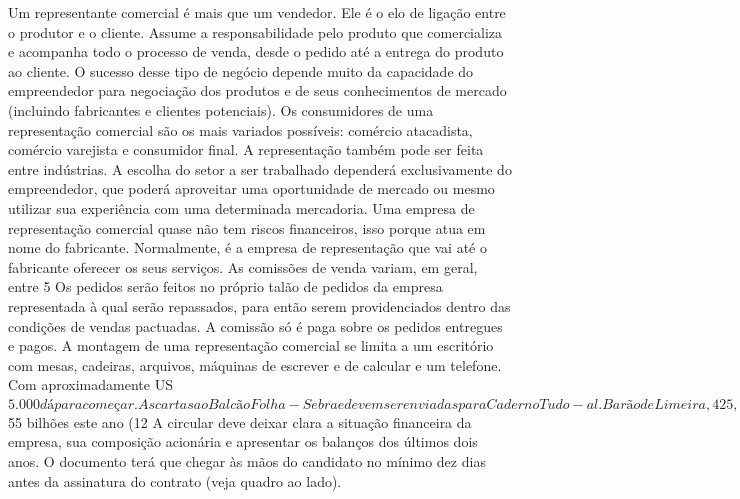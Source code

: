 Um representante comercial é mais que um vendedor. Ele é o elo de ligação entre o produtor e o cliente. Assume a responsabilidade pelo produto que comercializa e acompanha todo o processo de venda, desde o pedido até a entrega do produto ao cliente.
O sucesso desse tipo de negócio depende muito da capacidade do empreendedor para negociação dos produtos e de seus conhecimentos de mercado (incluindo fabricantes e clientes potenciais).
Os consumidores de uma representação comercial são os mais variados possíveis: comércio atacadista, comércio varejista e consumidor final. A representação também pode ser feita entre indústrias.
A escolha do setor a ser trabalhado dependerá exclusivamente do empreendedor, que poderá aproveitar uma oportunidade de mercado ou mesmo utilizar sua experiência com uma determinada mercadoria.
Uma empresa de representação comercial quase não tem riscos financeiros, isso porque atua em nome do fabricante.
Normalmente, é a empresa de representação que vai até o fabricante oferecer os seus serviços. As comissões de venda variam, em geral, entre 5%
Os pedidos serão feitos no próprio talão de pedidos da empresa representada à qual serão repassados, para então serem providenciados dentro das condições de vendas pactuadas. A comissão só é paga sobre os pedidos entregues e pagos.
A montagem de uma representação comercial se limita a um escritório com mesas, cadeiras, arquivos, máquinas de escrever e de calcular e um telefone. Com aproximadamente US$ 5.000 dá para começar.

As cartas ao Balcão Folha-Sebrae devem ser enviadas para Caderno Tudo - al. Barão de Limeira, 425, 4º andar, CEP 01290-900, São Paulo, SP, com nome, profissão, endereço, telefone e ramo de atividade; elas serão respondidas pela equipe técnica do sistema Sebrae.
</TEXT>
</DOC>
<DOC>
<DOCNO>FSP950101-112</DOCNO>
<DOCID>FSP950101-112</DOCID>
<DATE>950101</DATE>
<CATEGORY>VEÍCULOS</CATEGORY>
<TEXT>
NELSON ROCCO 
Da Reportagem Local 
Um dos sistemas empresariais que mais cresce no mundo o de franquias ganhou legislação própria: a lei nº 8.955, sancionada pelo presidente Itamar Franco, em dezembro.
A nova lei, que regulamenta a compra e venda de franquias, determina que os franqueadores forneçam aos interessados em aderir ao sistema uma Circular de Oferta de Franquia, um documento com informações sobre a empresa.
A lei que entra em vigor em fevereiro deve dar mais segurança ao sistema, que faturou cerca de US$ 55 bilhões este ano (12%
A circular deve deixar clara a situação financeira da empresa, sua composição acionária e apresentar os balanços dos últimos dois anos.
O documento terá que chegar às mãos do candidato no mínimo dez dias antes da assinatura do contrato (veja quadro ao lado).

